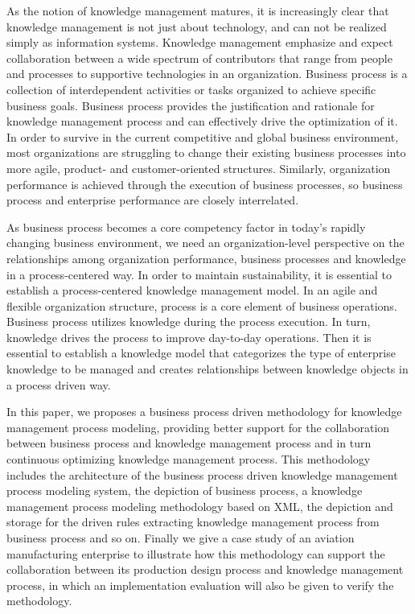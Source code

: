 \documentclass{elsarticle}
\begin{document}
\textrm{As the notion of knowledge management matures, it is
increasingly clear that knowledge management is not just about
technology, and can not be realized simply as information systems.
}Knowledge management 
emphasize and expect collaboration between a wide spectrum of
contributors that range from people and processes to supportive
technologies in an organization. Business process is a collection of
interdependent activities or tasks organized to achieve specific
business goals. Business process provides the justification and
rationale for knowledge management process and can effectively drive
the optimization of it\cite{raghu2007business}. 
In order to survive in the current
competitive and global business environment, most organizations are
struggling to change their existing business processes into more agile,
product- and customer-oriented structures\cite{ballard2005business}. Similarly, organization
performance is achieved through the execution of business processes, so
business process and enterprise performance are closely
interrelated\cite{kang2007process}.


As business process becomes a core competency factor in
today's rapidly changing business environment, we need an
organization-level perspective on the relationships among
organization performance, business processes and knowledge in a
process-centered way. In order to maintain sustainability, it is
essential to establish a process-centered knowledge management model.
In an agile and flexible organization structure, process is a core
element of business operations. Business process utilizes
knowledge during the process execution. In turn, knowledge drives the process to improve
day-to-day operations. Then it is essential to establish a knowledge
model that categorizes the type of enterprise knowledge to be managed
and creates relationships between knowledge objects in a process driven
way.


In this paper, we proposes a business process driven methodology
for knowledge management process modeling, providing better support for
the collaboration between business process and knowledge management
process and in turn continuous optimizing knowledge management process.
This methodology includes the architecture of the business process
driven knowledge management process modeling system, the depiction of
business process, a knowledge management process modeling methodology
based on XML, the depiction and storage for the driven rules
extracting knowledge management process from
business  process and so on. Finally we
give a case study of an aviation manufacturing enterprise to illustrate
how this methodology can support the collaboration between its
production design process and knowledge management process, in which an
implementation evaluation will also be given to verify the
methodology.
\end{document}
